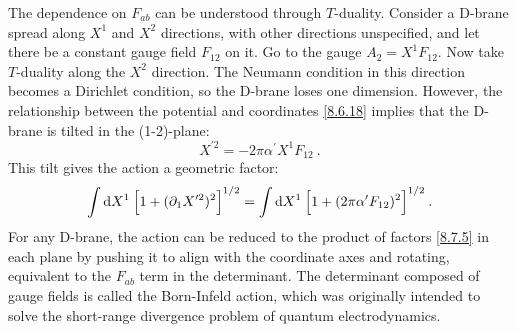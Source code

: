 The dependence on $F_{ab}$ can be understood through $T$-duality. Consider a D-brane spread along $X^{1}$ and $X^{2}$ directions, with other directions unspecified, and let there be a constant gauge field $F_{12}$ on it. 
Go to the gauge $A_{2}=X^{1} F_{12}$. Now take $T$-duality along the $X^{2}$ direction. 
The Neumann condition in this direction becomes a Dirichlet condition, so the D-brane loses one dimension. 
However, the relationship between the potential and coordinates \eqref{8.6.18} implies that the D-brane is tilted in the (1-2)-plane:
\begin{equation}
	X^{\prime 2}=-2 \pi \alpha^{\prime} X^{1} F_{12} \:. \label{8.7.4}
\end{equation}
This tilt gives the action a geometric factor:
\begin{equation}
	\int \mathrm{d} X^{1}\: \Bigl[1 + (\partial_{1} X^{\prime 2})^{2}\Bigr]^{1/2} 
	=\int \mathrm{d} X^{1}\: \Bigl[1 + (2 \pi \alpha^{\prime} F_{12})^{2}\Bigr]^{1/2} \:. \label{8.7.5}
\end{equation}
For any D-brane, the action can be reduced to the product of factors \eqref{8.7.5} in each plane by pushing it to align with the coordinate axes and rotating, 
equivalent to the $F_{ab}$ term in the determinant. The determinant composed of gauge fields is called the Born-Infeld action, which was originally intended to solve the short-range divergence problem of quantum electrodynamics.

